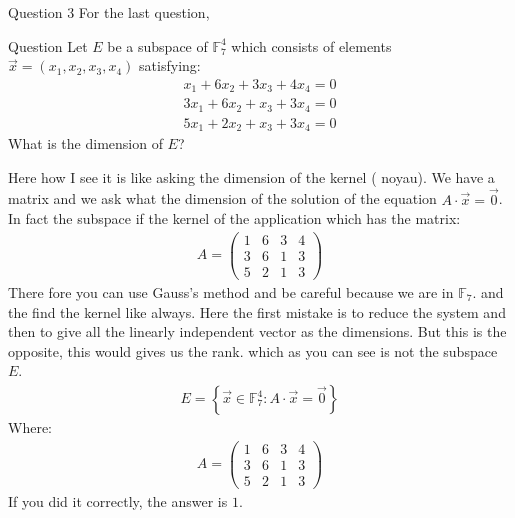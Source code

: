 \begin{parag}{Question 3}
    For the last question, 
    \begin{subparag}{Question}
        Let $E$ be a subspace of $\mathbb{F}_7^4$ which consists of elements $\vec{x} = \left(x_1, x_2, x_3, x_4\right)$ satisfying:
        \begin{align*} 
            x_1 + 6x_2 + 3x_3 + 4x_4 = 0\\
            3x_1 + 6x_2 + x_3 + 3x_4 = 0\\
            5x_1 + 2x_2 + x_3 + 3x_4 =  0
        \end{align*}
        What is the dimension of $E$? 
    \end{subparag}
    Here how I see it is like asking  the dimension of the kernel ( noyau). We have a matrix and we ask what the dimension of the solution of the equation $A \cdot  \vec{x} =  \vec{0}$. In fact the subspace if the kernel of the application which has the matrix:
    \begin{align*} 
        A = \begin{pmatrix} 1 & 6 & 3 & 4 \\ 3 & 6 & 1 & 3 \\ 5 & 2 & 1 & 3 \end{pmatrix} 
    \end{align*}
    There fore you can use Gauss's method and be careful because we are in $\mathbb{F}_7$. and the find the kernel like always. Here the first mistake is to reduce the system and then to give all the linearly independent vector as the dimensions. But this is the opposite, this would gives us the rank. which as you can see is not the subspace $E$.
    \begin{align*} E =  \left\{\vec{x} \in \mathbb{F}_7^4: A \cdot  \vec{x} =  \vec{0}\right\} \end{align*}
    Where:
    \begin{align*} 
        A = \begin{pmatrix} 1 & 6 & 3 & 4 \\ 3 & 6 & 1 & 3 \\ 5 & 2 & 1 & 3 \end{pmatrix} 
    \end{align*}
    If you did it correctly, the answer is $1$.

\end{parag}





